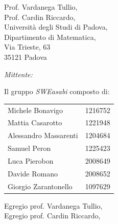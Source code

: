 \documentclass{article}
\begin{document}
\begin{center}
\begin{minipage}[t]{0.49\linewidth}
\begin{flushleft}
\begin{minipage}[t]{0.8\linewidth}
\begin{flushleft}
            Prof. Vardanega Tullio,\\
            Prof. Cardin Riccardo,\\
            Università degli Studi di Padova,\\
            Dipartimento di Matematica,\\
            Via Trieste, 63\\
            35121 Padova\\        
        \end{flushleft}
        \end{minipage}
        \end{flushleft}
    \end{minipage}
    \begin{minipage}[t]{0.49\linewidth}
        \begin{flushright}

        \begin{minipage}[t]{1\linewidth}
            
        \begin{flushright}
        \normalsize
        \textit{Mittente:}
        \vspace{0.5cm}

        Il gruppo \textit{SWEasabi} composto di:
            \begin{tabularx}{0.87\linewidth}{l | X}
                Michele Bonavigo & 1216752 \\
                Mattia Casarotto & 1221948 \\
                Alessandro Massarenti & 1204684 \\
                Samuel Peron & 1225423 \\
                Luca Pierobon & 2008649 \\
                Davide Romano & 2008652 \\
                Giorgio Zarantonello & 1097629 
            \end{tabularx}
        \end{flushright}
        \end{minipage}
        \end{flushright}
    \end{minipage}
    
    \normalsize
\end{center}

\vspace{1,5cm}

Egregio prof. Vardanega Tullio,\\
Egregio prof. Cardin Riccardo,
\end{document}
